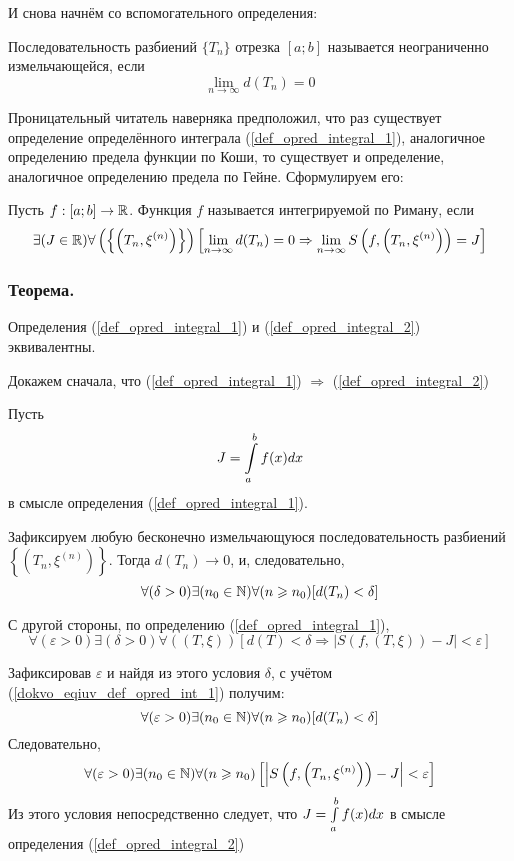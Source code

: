 И снова начнём со вспомогательного определения:

\opred
Последовательность разбиений $\{T_n\}$ отрезка $[a;b]$ называется неограниченно измельчающейся, если 
$$\lim_{n\to\infty}d(T_n) = 0$$

Проницательный читатель наверняка предположил, что раз существует определение определённого интеграла (\ref{def_opred_integral_1}), аналогичное определению предела функции по Коши, то существует и определение, аналогичное определению предела по Гейне. Сформулируем его:

\begin{opr}\label{eqiv_opr_opr_intl}
Пусть $f:[a;b]\to \mathbb{R}$. Функция $f$ называется интегрируемой по Риману, если
\begin{equation}\label{def_opred_integral_2}
\exists(J\in\mathbb{R})\forall\left(\left\{\left(T_n,\xi^{(n)}\right)\right\}\right)
\left[\lim_{n\to\infty}d(T_n) = 0 \Rightarrow \lim_{n\to\infty}S\left(f,\left(T_n,\xi^{(n)}\right)\right)=J\right]
\end{equation}
\end{opr}

\subsubsection{Теорема.}
Определения (\ref{def_opred_integral_1}) и (\ref{def_opred_integral_2}) эквивалентны.

Докажем сначала, что (\ref{def_opred_integral_1}) $\Rightarrow$ (\ref{def_opred_integral_2})

\dokvo
Пусть $$J=\int\limits_a^b f(x) dx $$ в смысле определения (\ref{def_opred_integral_1}).

Зафиксируем любую бесконечно измельчающуюся последовательность разбиений $\left\{\left( T_n, \xi^{(n)}\right)\right\}$. Тогда $d(T_n)\to 0$, и, следовательно,
\begin{equation}\label{dokvo_eqiuv_def_opred_int_1}
\forall(\delta>0)\exists(n_0\in\mathbb{N})\forall(n\geqslant n_0)[d(T_n)<\delta]
\end{equation}

С другой стороны, по определению (\ref{def_opred_integral_1}),
$$
\forall(\varepsilon>0)\exists(\delta>0)\forall((T,\xi))[d(T)<\delta \Rightarrow |S(f,(T,\xi))-J|<\varepsilon]
$$

Зафиксировав $\varepsilon$ и найдя из этого условия $\delta$, с учётом (\ref{dokvo_eqiuv_def_opred_int_1}) получим:
$$
\forall(\varepsilon>0)\exists(n_0\in\mathbb{N})\forall(n\geqslant n_0)[d(T_n)<\delta]
$$
Следовательно,
$$
\forall(\varepsilon>0)\exists(n_0\in\mathbb{N})\forall(n\geqslant n_0)\left[\left|S\left(f,\left(T_n,\xi^{(n)}\right)\right)-J\right|<\varepsilon\right]
$$
Из этого условия непосредственно следует, что $J=\int\limits_a^b f(x) dx$ в смысле определения (\ref{def_opred_integral_2})

